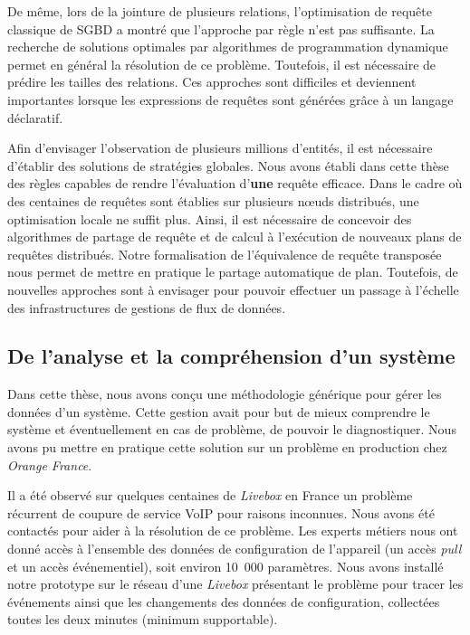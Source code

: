 De même, lors de la jointure de plusieurs relations, l'optimisation de requête classique de SGBD a montré que l'approche par règle n'est pas suffisante. La recherche de solutions optimales par algorithmes de programmation dynamique permet en général la résolution de ce problème. Toutefois, il est nécessaire de prédire les tailles des relations. Ces approches sont difficiles et deviennent importantes lorsque les expressions de requêtes sont générées grâce à un langage déclaratif.

Afin d'envisager l'observation de plusieurs millions d'entités, il est nécessaire d'établir des solutions de stratégies globales. Nous avons établi dans cette thèse des règles capables de rendre l'évaluation d'\textbf{une} requête efficace. Dans le cadre où des centaines de requêtes sont établies sur plusieurs nœuds distribués, une optimisation locale ne suffit plus. Ainsi, il est nécessaire de concevoir des algorithmes de partage de requête et de calcul à l'exécution de nouveaux plans de requêtes distribués. Notre formalisation de l'équivalence de requête transposée nous permet de mettre en pratique le partage automatique de plan. Toutefois, de nouvelles approches sont à envisager pour pouvoir effectuer un passage à l'échelle des infrastructures de gestions de flux de données.

\subsection{De l'analyse et la compréhension d'un système}
Dans cette thèse, nous avons conçu une méthodologie générique pour gérer les données d'un système. Cette gestion avait pour but de mieux comprendre le système et éventuellement en cas de problème, de pouvoir le diagnostiquer. Nous avons pu mettre en pratique cette solution sur un problème en production chez \textit{Orange France}.

Il a été observé sur quelques centaines de \textit{Livebox} en France un problème récurrent de coupure de service VoIP pour raisons inconnues. Nous avons été contactés pour aider à la résolution de ce problème. Les experts métiers nous ont donné accès à l'ensemble des données de configuration de l'appareil (un accès \textit{pull} et un accès événementiel), soit environ 10~000 paramètres. Nous avons installé notre prototype sur le réseau d'une \textit{Livebox} présentant le problème pour tracer les événements ainsi que les changements des données de configuration, collectées toutes les deux minutes (minimum supportable).

